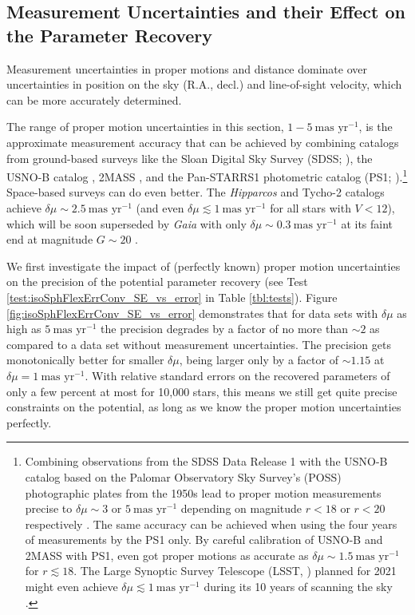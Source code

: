 \documentclass[iop,revtex4,numberedappendix,appendixfloats]{emulateapj}
\begin{document}
\subsection{Measurement Uncertainties and their Effect on the Parameter Recovery} \label{sec:results_errors}

Measurement uncertainties in proper motions and distance dominate over uncertainties in position on the sky (R.A., decl.) and line-of-sight velocity, which can be more accurately determined.

The range of proper motion uncertainties in this section, $1-5~\text{mas yr}^{-1}$, is the approximate measurement accuracy that can be achieved by combining catalogs from ground-based surveys like the Sloan Digital Sky Survey (SDSS; \citealt{2003AJ....126.2081A}), the USNO-B catalog \citep{2003AJ....125..984M}, 2MASS \citep{2006AJ....131.1163S}, and the Pan-STARRS1 photometric catalog (PS1; \citealt{2010SPIE.7733E..0EK}).\footnote{Combining observations from the SDSS Data Release 1 with the USNO-B catalog based on the Palomar Observatory Sky Survey's (POSS) photographic plates from the 1950s lead to proper motion measurements precise to $\delta\mu\sim3$ or $5~\text{mas yr}^{-1}$ depending on magnitude $r<18$ or $r<20$ respectively \citep{2004AJ....127.3034M,2008AJ....136..895M,2004ApJS..152..103G}. The same accuracy can be achieved when using the four years of measurements by the PS1 only. By careful calibration of USNO-B and 2MASS with PS1, \citet{2015ApJ...809...59S} even got proper motions as accurate as $\delta \mu\sim1.5~\text{mas yr}^{-1}$ for $r\lesssim 18$. The Large Synoptic Survey Telescope (LSST, \citealt{2008arXiv0805.2366I}) planned for 2021 might even achieve $\delta\mu \lesssim 1~\text{mas yr}^{-1}$ during its 10 years of scanning the sky \citep{2008IAUS..248..537I}.} Space-based surveys can do even better. The \emph{Hipparcos} \citep{1997ESASP1200.....E} and Tycho-2 \citep{2000A&A...355L..27H} catalogs achieve $\delta \mu\sim2.5~\text{mas yr}^{-1}$ (and even $\delta\mu \lesssim 1~\text{mas yr}^{-1}$ for all stars with $V <12$), which will be soon superseded by \emph{Gaia} with only $\delta \mu\sim0.3~\text{mas yr}^{-1}$ at its faint end at magnitude $G\sim20$ \citep{2014EAS....67...23D}.

We first investigate the impact of (perfectly known) proper motion uncertainties on the precision of the potential parameter recovery (see Test \ref{test:isoSphFlexErrConv_SE_vs_error} in Table \ref{tbl:tests}). Figure \ref{fig:isoSphFlexErrConv_SE_vs_error} demonstrates that for data sets with $\delta \mu$ as high as $5~\text{mas yr}^{-1}$ the precision degrades by a factor of no more than $\sim2$ as compared to a data set without measurement uncertainties. The precision gets monotonically better for smaller $\delta \mu$, being larger only by a factor of $\sim 1.15$ at $\delta \mu=1~\text{mas yr}^{-1}$. With relative standard errors on the recovered parameters of only a few percent at most for 10,000 stars, this means we still get quite precise constraints on the potential, as long as we know the proper motion uncertainties perfectly.
\end{document}
